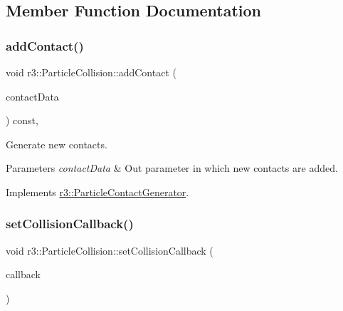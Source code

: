 \subsection{Member Function Documentation}
\mbox{\label{classr3_1_1_particle_collision_adb77c85cb90707073e7c654acb2e6719}} 
\subsubsection{\texorpdfstring{add\+Contact()}{addContact()}}
{\footnotesize\ttfamily void r3\+::\+Particle\+Collision\+::add\+Contact (\begin{DoxyParamCaption}\item[{\mbox{\hyperlink{classr3_1_1_fixed_size_container}{Fixed\+Size\+Container}}$<$ \mbox{\hyperlink{classr3_1_1_particle_contact}{Particle\+Contact}} $>$ \&}]{contact\+Data }\end{DoxyParamCaption}) const\hspace{0.3cm}{\ttfamily [override]}, {\ttfamily [virtual]}}



Generate new contacts. 


\begin{DoxyParams}{Parameters}
{\em contact\+Data} & Out parameter in which new contacts are added. \\
\hline
\end{DoxyParams}


Implements \mbox{\hyperlink{classr3_1_1_particle_contact_generator_a39a7a8f0d5b31b1ca2c2ace2af8e2978}{r3\+::\+Particle\+Contact\+Generator}}.

\mbox{\label{classr3_1_1_particle_collision_ada3299069d9e5436a6839c70fdd0c820}} 
\subsubsection{\texorpdfstring{set\+Collision\+Callback()}{setCollisionCallback()}}
{\footnotesize\ttfamily void r3\+::\+Particle\+Collision\+::set\+Collision\+Callback (\begin{DoxyParamCaption}\item[{const \mbox{\hyperlink{classr3_1_1_particle_collision_a85d1a02ec35335322e5a3ce47f0e46cf}{Collision\+Callback}} \&}]{callback }\end{DoxyParamCaption})}




